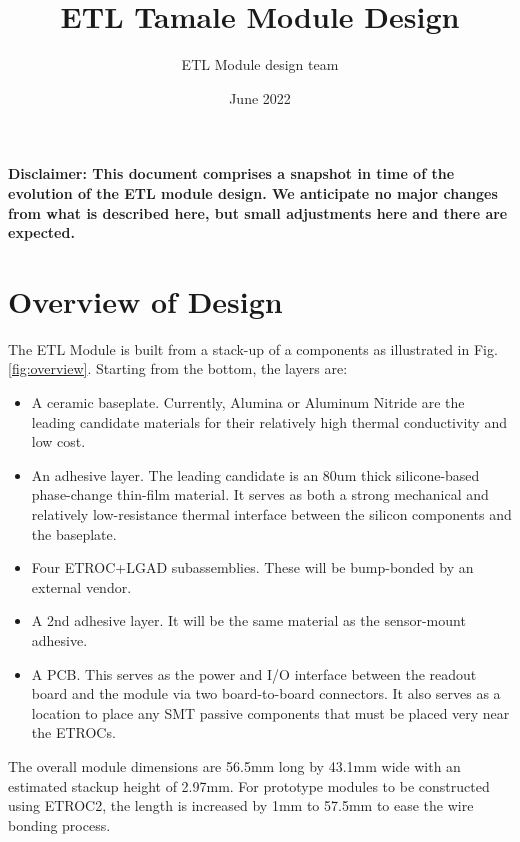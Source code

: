 \documentclass[10pt]{datasheet}
\title{ETL Tamale Module Design}
\author{ETL Module design team}
\date{June 2022}
\begin{document}
\maketitle


\onecolumn

\begin{versionhistory}
\end{versionhistory}

\begin{Large}
	\textbf{
    Disclaimer: This document comprises a snapshot in time of the evolution of the ETL module design. We anticipate no major changes from what is described here, but small adjustments here and there are expected.}
\end{Large}

\section{Overview of Design}

The ETL Module is built from a stack-up of a components as illustrated in Fig. \ref{fig:overview}. Starting from the bottom, the layers are:

\begin{itemize}
	\item A ceramic baseplate. Currently, Alumina or Aluminum Nitride are the leading candidate materials for their relatively high thermal conductivity and low cost.  
	\item An adhesive layer. The leading candidate is an 80um thick silicone-based phase-change thin-film material. It serves as both a strong mechanical and relatively low-resistance thermal interface between the silicon components and the baseplate.  
	\item Four ETROC+LGAD subassemblies. These will be bump-bonded by an external vendor.
	\item A 2nd adhesive layer. It will be the same material as the sensor-mount adhesive.
	\item A PCB. This serves as the power and I/O interface between the readout board and the module via two board-to-board connectors. It also serves as a location to place any SMT passive components that must be placed very near the ETROCs.
\end{itemize}

The overall module dimensions are 56.5mm long by 43.1mm wide with an estimated stackup height of 2.97mm. For prototype modules to be constructed using ETROC2, the length is increased by 1mm to 57.5mm to ease the wire bonding process.
\end{document}
